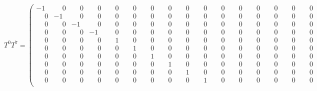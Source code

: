 \documentclass[10pt]{article}
\begin{document}
\[
T^{0}T^{7} = \left(\begin{smallmatrix}
-1 & \phantom{-}0 & \phantom{-}0 & \phantom{-}0 & \phantom{-}0 & \phantom{-}0 & \phantom{-}0 & \phantom{-}0 & \phantom{-}0 & \phantom{-}0 & \phantom{-}0 & \phantom{-}0 & \phantom{-}0 & \phantom{-}0 & \phantom{-}0 & \phantom{-}0 \\
\phantom{-}0 & -1 & \phantom{-}0 & \phantom{-}0 & \phantom{-}0 & \phantom{-}0 & \phantom{-}0 & \phantom{-}0 & \phantom{-}0 & \phantom{-}0 & \phantom{-}0 & \phantom{-}0 & \phantom{-}0 & \phantom{-}0 & \phantom{-}0 & \phantom{-}0 \\
\phantom{-}0 & \phantom{-}0 & -1 & \phantom{-}0 & \phantom{-}0 & \phantom{-}0 & \phantom{-}0 & \phantom{-}0 & \phantom{-}0 & \phantom{-}0 & \phantom{-}0 & \phantom{-}0 & \phantom{-}0 & \phantom{-}0 & \phantom{-}0 & \phantom{-}0 \\
\phantom{-}0 & \phantom{-}0 & \phantom{-}0 & -1 & \phantom{-}0 & \phantom{-}0 & \phantom{-}0 & \phantom{-}0 & \phantom{-}0 & \phantom{-}0 & \phantom{-}0 & \phantom{-}0 & \phantom{-}0 & \phantom{-}0 & \phantom{-}0 & \phantom{-}0 \\
\phantom{-}0 & \phantom{-}0 & \phantom{-}0 & \phantom{-}0 & \phantom{-}1 & \phantom{-}0 & \phantom{-}0 & \phantom{-}0 & \phantom{-}0 & \phantom{-}0 & \phantom{-}0 & \phantom{-}0 & \phantom{-}0 & \phantom{-}0 & \phantom{-}0 & \phantom{-}0 \\
\phantom{-}0 & \phantom{-}0 & \phantom{-}0 & \phantom{-}0 & \phantom{-}0 & \phantom{-}1 & \phantom{-}0 & \phantom{-}0 & \phantom{-}0 & \phantom{-}0 & \phantom{-}0 & \phantom{-}0 & \phantom{-}0 & \phantom{-}0 & \phantom{-}0 & \phantom{-}0 \\
\phantom{-}0 & \phantom{-}0 & \phantom{-}0 & \phantom{-}0 & \phantom{-}0 & \phantom{-}0 & \phantom{-}1 & \phantom{-}0 & \phantom{-}0 & \phantom{-}0 & \phantom{-}0 & \phantom{-}0 & \phantom{-}0 & \phantom{-}0 & \phantom{-}0 & \phantom{-}0 \\
\phantom{-}0 & \phantom{-}0 & \phantom{-}0 & \phantom{-}0 & \phantom{-}0 & \phantom{-}0 & \phantom{-}0 & \phantom{-}1 & \phantom{-}0 & \phantom{-}0 & \phantom{-}0 & \phantom{-}0 & \phantom{-}0 & \phantom{-}0 & \phantom{-}0 & \phantom{-}0 \\
\phantom{-}0 & \phantom{-}0 & \phantom{-}0 & \phantom{-}0 & \phantom{-}0 & \phantom{-}0 & \phantom{-}0 & \phantom{-}0 & \phantom{-}1 & \phantom{-}0 & \phantom{-}0 & \phantom{-}0 & \phantom{-}0 & \phantom{-}0 & \phantom{-}0 & \phantom{-}0 \\
\phantom{-}0 & \phantom{-}0 & \phantom{-}0 & \phantom{-}0 & \phantom{-}0 & \phantom{-}0 & \phantom{-}0 & \phantom{-}0 & \phantom{-}0 & \phantom{-}1 & \phantom{-}0 & \phantom{-}0 & \phantom{-}0 & \phantom{-}0 & \phantom{-}0 & \phantom{-}0 \\

\end{smallmatrix}\]
\end{document}
